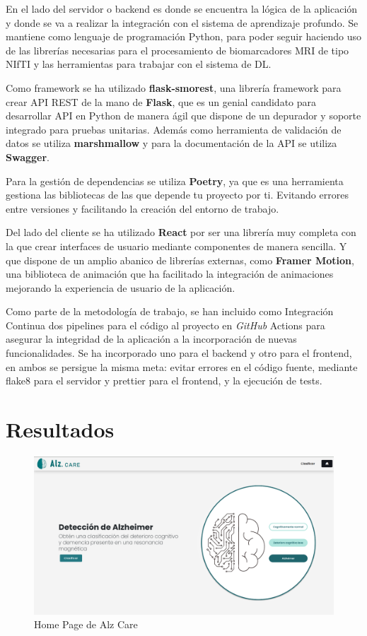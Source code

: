 En el lado del servidor o backend es donde se encuentra la lógica de la aplicación y donde se va a realizar la
integración con el sistema de aprendizaje profundo.
Se mantiene como lenguaje de programación Python, para poder seguir haciendo uso de las librerías necesarias para el
procesamiento de biomarcadores MRI de tipo NIfTI y las herramientas para trabajar con el sistema de DL.

Como framework se ha utilizado \textbf{flask-smorest}, una librería framework para crear API REST de la mano de
\textbf{Flask}, que es un genial candidato para desarrollar API en Python de manera ágil que dispone de un depurador
y soporte integrado para pruebas unitarias.
Además como herramienta de validación de datos se utiliza \textbf{marshmallow} y para la documentación de la API se utiliza
\textbf{Swagger}.

Para la gestión de dependencias se utiliza \textbf{Poetry}, ya que es una herramienta gestiona las bibliotecas de las que depende
tu proyecto por ti.
Evitando errores entre versiones y facilitando la creación del entorno de trabajo.

Del lado del cliente se ha utilizado \textbf{React} por ser una librería muy completa con la que crear interfaces de usuario
mediante componentes de manera sencilla.
Y que dispone de un amplio abanico de librerías externas, como \textbf{Framer Motion}, una biblioteca de animación que ha
facilitado la integración de animaciones mejorando la experiencia de usuario de la aplicación.

Como parte de la metodología de trabajo, se han incluido como Integración Continua dos pipelines para el código al
proyecto en \textit{GitHub} Actions para asegurar la integridad de la aplicación a la incorporación de nuevas funcionalidades.
Se ha incorporado uno para el backend y otro para el frontend, en ambos se persigue la misma meta: evitar errores en
el código fuente, mediante flake8 para el servidor y prettier para el frontend, y la ejecución de tests.


\section{Resultados}\label{sec:resultados}

\begin{figure}[H]
    \centering
    \includegraphics[width=\textwidth]{./imgs/app/final-home}
    \caption{Home Page de Alz Care}
    \label{fig:home-page}
\end{figure}

